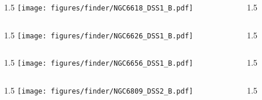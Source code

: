 \documentclass[final]{beamer}
\newlength{\colwidth}
\begin{document}

\begin{frame}[t]{}
  \begin{columns}[T]
    \begin{column}{1.5\colwidth}
      \centering
      \texttt{[image: figures/finder/NGC6618\_DSS1\_B.pdf]}
    \end{column}
    \begin{column}{1.5\colwidth}
      \Large
      
    \end{column}
  \end{columns}
  \vspace{\fill}
  \begin{columns}[T]
    \begin{column}{1.5\colwidth}
      \centering
      \texttt{[image: figures/finder/NGC6626\_DSS1\_B.pdf]}
    \end{column}
    \begin{column}{1.5\colwidth}
      \Large
      
    \end{column}
  \end{columns}
\end{frame}


\begin{frame}[t]{}
  \begin{columns}[T]
    \begin{column}{1.5\colwidth}
      \centering
      \texttt{[image: figures/finder/NGC6656\_DSS1\_B.pdf]}
    \end{column}
    \begin{column}{1.5\colwidth}
      \Large
      
    \end{column}
  \end{columns}
  \vspace{\fill}
  \begin{columns}[T]
    \begin{column}{1.5\colwidth}
      \centering
      \texttt{[image: figures/finder/NGC6809\_DSS2\_B.pdf]}
    \end{column}
    \begin{column}{1.5\colwidth}
      \Large
      
    \end{column}
  \end{columns}
\end{frame}
\end{document}
